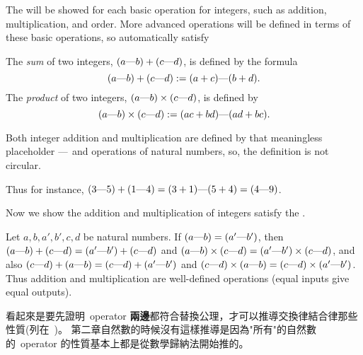 \begin{note}
The  will be showed for each basic operation for integers, such as addition, multiplication, and order.
More advanced operations will be defined in terms of these basic operations, so automatically satisfy 
\end{note}

\begin{definition}  \label{def 4.1.2}
The \emph{sum} of two integers, \((a \text{---} b) + (c \text{---} d)\), is defined by the formula
\[
    (a \text{---} b) + (c \text{---} d) := (a + c) \text{---} (b + d).
\]
The \emph{product} of two integers, \((a \text{---} b) \times (c \text{---} d)\), is defined by
\[
    (a \text{---} b) \times (c \text{---} d) := (ac + bd) \text{---} (ad + bc).
\]
\end{definition}

\begin{note}
Both integer addition and multiplication are defined by that meaningless placeholder \(\text{---}\) and operations of natural numbers, so, the definition is not circular.
\end{note}

Thus for instance, \((3 \text{---} 5) + (1 \text{---} 4) = (3 + 1) \text{---} (5 + 4) =  (4 \text{---} 9)\).

Now we show the addition and multiplication of integers satisfy the .

\begin{lemma}  \label{lem 4.1.3}
Let \(a, b, a', b', c, d\) be natural numbers.
If \((a \text{---} b) = (a' \text{---} b')\), then \((a \text{---} b) + (c \text{---} d) = (a' \text{---} b') + (c \text{---} d)\) and \((a \text{---} b) \times (c \text{---} d) = (a' \text{---} b') \times (c \text{---} d)\),
and also \((c \text{---} d) + (a \text{---} b) = (c \text{---} d) + (a' \text{---} b')\) and \((c \text{---} d) \times (a \text{---} b) = (c \text{---} d) \times (a' \text{---} b')\).
Thus addition and multiplication are well-defined operations (equal inputs give equal outputs).
\end{lemma}

\begin{note}
看起來是要先證明\ operator \textbf{兩邊}都符合替換公理，才可以推導交換律結合律那些性質(列在\ )。
第二章自然數的時候沒有這樣推導是因為"所有"的自然數的\ operator 的性質基本上都是從數學歸納法開始推的。
\end{note}

